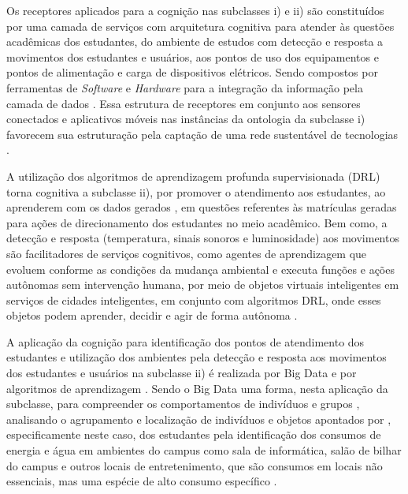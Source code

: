 \documentclass[portuguese]{textolivre}
\begin{document}
Os receptores aplicados para a cognição nas subclasses i) e ii) são constituídos por uma camada de serviços com arquitetura cognitiva \cite{park2019} para atender às questões acadêmicas dos estudantes, do ambiente de estudos com detecção e resposta a movimentos dos estudantes e usuários, aos pontos de uso dos equipamentos e pontos de alimentação e carga de dispositivos elétricos. Sendo compostos por ferramentas de \textit{Software} e \textit{Hardware} \cite{mansouri2018} para a integração da informação pela camada de dados \cite{khansari2015}. Essa estrutura de receptores em conjunto aos sensores conectados e aplicativos móveis nas instâncias da ontologia da subclasse i) favorecem sua estruturação pela captação de uma rede sustentável de tecnologias \cite{chapman2021}.

A utilização dos algoritmos de aprendizagem profunda supervisionada (DRL) torna cognitiva a subclasse ii), por promover o atendimento aos estudantes, ao aprenderem com os dados gerados \cite{mohammadi2018}, em questões referentes às matrículas geradas para ações de direcionamento dos estudantes no meio acadêmico. Bem como, a detecção e resposta (temperatura, sinais sonoros e luminosidade) aos movimentos são facilitadores de serviços cognitivos, como agentes de aprendizagem que evoluem conforme as condições da mudança ambiental e executa funções e ações autônomas sem intervenção humana, por meio de objetos virtuais inteligentes em serviços de cidades inteligentes, em conjunto com algoritmos DRL, onde esses objetos podem aprender, decidir e agir de forma autônoma \cite{mohammadi2018}.

A aplicação da cognição para identificação dos pontos de atendimento dos estudantes e utilização dos ambientes pela detecção e resposta aos movimentos dos estudantes e usuários na subclasse ii) é realizada por Big Data e por algoritmos de aprendizagem \cite{wang2023}. Sendo o Big Data uma forma, nesta aplicação da subclasse, para compreender os comportamentos de indivíduos e grupos \cite{sangwan2021}, analisando o agrupamento e localização de indivíduos e objetos apontados por \cite{coccoli2022}, especificamente neste caso, dos estudantes pela identificação dos consumos de energia e água em ambientes do campus como sala de informática, salão de bilhar do campus e outros locais de entretenimento, que são consumos em locais não essenciais, mas uma espécie de alto consumo específico \cite{wang2023}.
\end{document}
